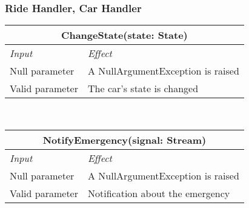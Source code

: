 			\subsubsection*{Ride Handler, Car Handler}
			\begin{tabular}{ |l|l| }
				\hline
				\multicolumn{2}{|c|}{ChangeState(state: State)}\\
				\hline
				\textit{Input}&\textit{Effect}\\ \hline
				Null parameter & A NullArgumentException is raised\\ \hline
				Valid parameter & The car's state is changed \\ \hline
			\end{tabular}
			\\
			\begin{tabular}{ |l|l| }
				\hline
				\multicolumn{2}{|c|}{NotifyEmergency(signal: Stream)}\\
				\hline
				\textit{Input}&\textit{Effect}\\ \hline
				Null parameter & A NullArgumentException is raised \\ \hline
				Valid parameter &  Notification about the emergency \\ \hline
			\end{tabular}
			\\		
			
